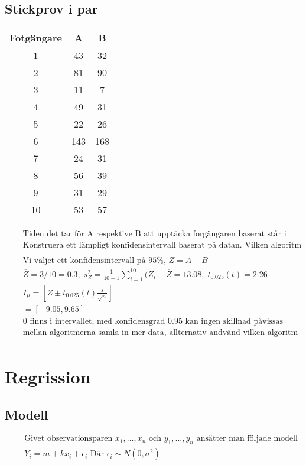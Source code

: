 \subsection{Stickprov i par}
\begin{tabular}{c|c|c}
 Fotgängare &  A & B \\
 \hline
     1      & 43  & 32 \\
     2      & 81  & 90 \\
     3      & 11  & 7 \\
     4      & 49  & 31 \\
     5      & 22  & 26 \\
     6      & 143 & 168 \\
     7      & 24  & 31 \\
     8      & 56  & 39 \\
     9      & 31  & 29 \\
    10      & 53  & 57 \\
\end{tabular}
\begin{align*}
  &\quad  \text{Tiden det tar för A respektive B att upptäcka forgängaren baserat står i tabellen}\\
  &\quad  \text{Konstruera ett lämpligt konfidensintervall baserat på datan. Vilken algoritm borde andvändas} \\
  &\quad  \\
  &\quad  \text{Vi väljet ett konfidensintervall på $95\%$, } Z=A-B \\
  &\quad  \overline{Z}=3/10=0.3, \; s^2_Z=\frac{1}{10-1}\sum_{i=1}^{10}(Z_i-\overline{Z}=13.08,
  \; t_{0.025}(t)=2.26 \\
  &\quad  I_{\mu} = [\overline{Z}\pm t_{0.025}(t)\frac{s}{\sqrt{n}}] \\
  &\quad          = [-9.05, 9.65] \\
  &\quad  0 \text{ finns i intervallet, med konfidensgrad $0.95$ kan ingen skillnad påvissas} \\
  &\quad  \text{mellan algoritmerna samla in mer data, allternativ andvänd vilken algoritm som helst} \\
\end{align*}


\section{Regrission}
\subsection{Modell}
\begin{align*}
  &\quad  \text{Givet observationsparen $x_1,...,x_n$ och $y_1,...,y_n$ ansätter man följade modell} \\
  &\quad  Y_i = m+kx_i+\epsilon_i \text{ Där } \epsilon_i\sim{N(0,\sigma^2)} \\
\end{align*}

